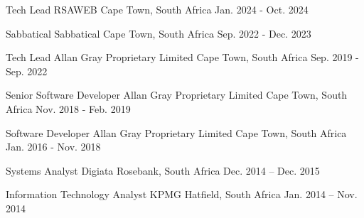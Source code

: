  \begin{cventries}
    \cventry{}{}{}{}{}
    
    
    \cventry
      {Tech Lead}
      {RSAWEB}
      {Cape Town, South Africa}
      {Jan. 2024 - Oct. 2024}
      {}

    \cventry
      {Sabbatical}
      {Sabbatical}
      {Cape Town, South Africa}
      {Sep. 2022 - Dec. 2023}
      {}

    \cventry
      {Tech Lead}
      {Allan Gray Proprietary Limited}
      {Cape Town, South Africa}
      {Sep. 2019 - Sep. 2022}
      {}

    \cventry
      {Senior Software Developer}
      {Allan Gray Proprietary Limited}
      {Cape Town, South Africa}
      {Nov. 2018 - Feb. 2019}
      {}

    \cventry
      {Software Developer}
      {Allan Gray Proprietary Limited}
      {Cape Town, South Africa}
      {Jan. 2016 - Nov. 2018}
      {}

    \cventry
      {Systems Analyst}
      {Digiata}
      {Rosebank, South Africa}
      {Dec. 2014 – Dec. 2015}
      {}
    
    \cventry
      {Information Technology Analyst}
      {KPMG}
      {Hatfield, South Africa}
      {Jan. 2014 – Nov. 2014}
      {}
  \end{cventries}
